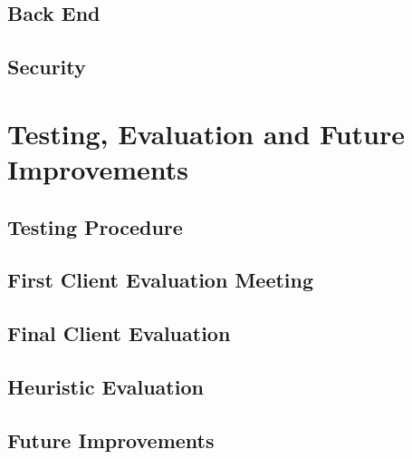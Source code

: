 \documentclass{l3proj}
\begin{document}
\section{Back End}

\section{Security}

\chapter{Testing, Evaluation and Future Improvements}
\label{testevfutimprv}

\section{Testing Procedure}

\section{First Client Evaluation Meeting}

\section{Final Client Evaluation}

\section{Heuristic Evaluation}

\section{Future Improvements}




\end{document}
